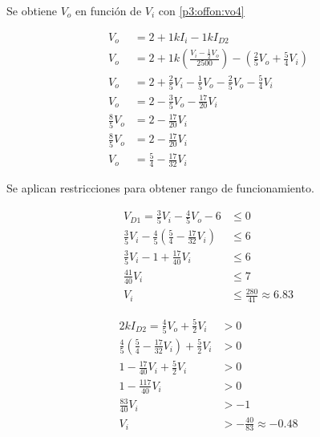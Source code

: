 Se obtiene $V_o$ en función de $V_i$ con \ref{p3:offon:vo4}

\begin{align*}
  V_o &= 2 + 1k I_i - 1k I_{D2}
  \\
  V_o &= 2 +
    1k \left(\frac{V_i-\frac{1}{2} V_o}{2500}\right) -
    \left(\frac{2}{5} V_o + \frac{5}{4} V_i\right)
  \\
  V_o &= 2 +
    \frac{2}{5} V_i - \frac{1}{5} V_o -
    \frac{2}{5} V_o - \frac{5}{4} V_i
  \\
  V_o &= 2 -\frac{3}{5} V_o - \frac{17}{20} V_i
  \\
  \frac{8}{5} V_o &= 2 - \frac{17}{20} V_i
  \\
  \frac{8}{5} V_o &= 2 - \frac{17}{20} V_i
  \\
  V_o &= \frac{5}{4} - \frac{17}{32} V_i
\end{align*}

Se aplican restricciones para obtener rango de funcionamiento.

\begin{align*}
  V_{D1} = \frac{3}{5} V_i - \frac{4}{5} V_o - 6  &\leq 0
  \\
  \frac{3}{5} V_i - \frac{4}{5} \left(\frac{5}{4} - \frac{17}{32} V_i\right) &\leq 6
  \\
  \frac{3}{5} V_i - 1 + \frac{17}{40} V_i &\leq 6
  \\
  \frac{41}{40} V_i &\leq 7
  \\
  V_i &\leq \frac{280}{41} \approx 6.83
\end{align*}

\begin{align*}
  2k I_{D2} = \frac{4}{5} V_o + \frac{5}{2} V_i &> 0
  \\
  \frac{4}{5} \left(\frac{5}{4} - \frac{17}{32} V_i\right) + \frac{5}{2} V_i &> 0
  \\
  1 - \frac{17}{40} V_i + \frac{5}{2} V_i &> 0
  \\
  1 - \frac{117}{40} V_i &> 0
  \\
  \frac{83}{40} V_i &> -1
  \\
  V_i &> -\frac{40}{83} \approx -0.48
\end{align*}
